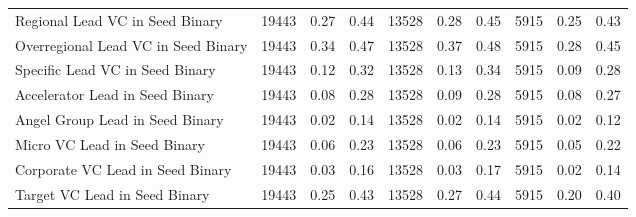 {\begin{table}[!h]
{\begin{tabular}[t]{lrrrrrrrrr}
Regional Lead VC in Seed Binary & 19443 & 0.27 & 0.44 & 13528 & 0.28 & 0.45 & 5915 & 0.25 & 0.43\\
Overregional Lead VC in Seed Binary & 19443 & 0.34 & 0.47 & 13528 & 0.37 & 0.48 & 5915 & 0.28 & 0.45\\
Specific Lead VC in Seed Binary & 19443 & 0.12 & 0.32 & 13528 & 0.13 & 0.34 & 5915 & 0.09 & 0.28\\
Accelerator Lead in Seed Binary & 19443 & 0.08 & 0.28 & 13528 & 0.09 & 0.28 & 5915 & 0.08 & 0.27\\
\addlinespace
Angel Group Lead in Seed Binary & 19443 & 0.02 & 0.14 & 13528 & 0.02 & 0.14 & 5915 & 0.02 & 0.12\\
Micro VC Lead in Seed Binary & 19443 & 0.06 & 0.23 & 13528 & 0.06 & 0.23 & 5915 & 0.05 & 0.22\\
Corporate VC Lead in Seed Binary & 19443 & 0.03 & 0.16 & 13528 & 0.03 & 0.17 & 5915 & 0.02 & 0.14\\
Target VC Lead in Seed Binary & 19443 & 0.25 & 0.43 & 13528 & 0.27 & 0.44 & 5915 & 0.20 & 0.40\\
\bottomrule
\end{tabular}}
\end{table}
}

